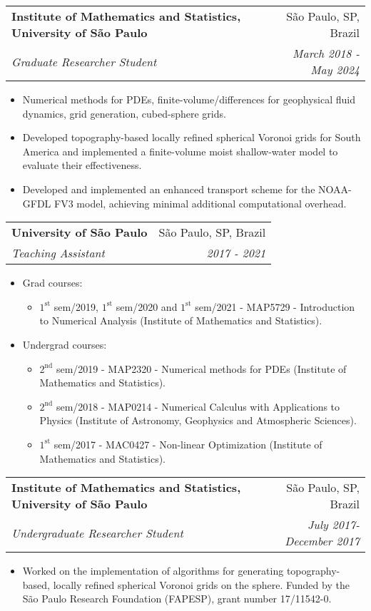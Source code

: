 \documentclass[letterpaper,11pt]{article}
\makeatletter
\newcommand{\resumeItem}[1]{
  \item\small{
    {#1 \vspace{-2pt}}
  }
}
\newcommand{\resumeSubheading}[4]{
  \vspace{-2pt}\item
    \begin{tabular*}{0.97\textwidth}[t]{l@{\extracolsep{\fill}}r}
      \textbf{#1} & #2 \\
      \textit{\small#3} & \textit{\small #4} \\
    \end{tabular*}\vspace{-7pt}
}
\newcommand{\resumeItemListStart}{\begin{itemize}}
\newcommand{\resumeItemListEnd}{\end{itemize}\vspace{-5pt}}
\makeatother
\begin{document}
\resumeSubheading
{Institute of Mathematics and Statistics, University of São Paulo}{São Paulo, SP, Brazil}{Graduate Researcher Student}
{March 2018 - May 2024}  
\resumeItemListStart
\resumeItem{Numerical methods for PDEs, finite-volume/differences for geophysical fluid dynamics, grid generation, cubed-sphere grids.}
\resumeItem{Developed topography-based locally refined spherical Voronoi grids for South America and implemented a finite-volume moist shallow-water model to evaluate their effectiveness.}
\resumeItem{Developed and implemented an enhanced transport scheme for the NOAA-GFDL FV3 model, achieving minimal additional computational overhead.}
\resumeItemListEnd



\resumeSubheading
{University of São Paulo}{São Paulo, SP, Brazil}
{Teaching Assistant}{2017 - 2021}
\resumeItemListStart
\resumeItem{Grad courses:}   
\begin{itemize}[label=\textendash]
	\item $1^{\textrm{st}}$ sem/2019, $1^{\textrm{st}}$ sem/2020 and $1^{\textrm{st}}$ sem/2021 - MAP5729 - Introduction to Numerical Analysis (Institute of Mathematics and Statistics).
\end{itemize} 
\resumeItem{Undergrad courses:}   
\begin{itemize}[label=\textendash]
	\item $2^{\textrm{nd}}$ sem/2019 - MAP2320 - Numerical methods for PDEs (Institute of Mathematics and Statistics).
	\item {$2^{\textrm{nd}}$ sem/2018 - MAP0214 - Numerical Calculus with Applications to Physics (Institute of Astronomy, Geophysics and Atmospheric Sciences).}        
	\item{$1^{\textrm{st}}$ sem/2017 - MAC0427 - Non-linear Optimization (Institute of Mathematics and Statistics).} 
\end{itemize}       
\resumeItemListEnd

\resumeSubheading
{Institute of Mathematics and Statistics, University of São Paulo }{São Paulo, SP, Brazil}{Undergraduate Researcher Student}
{July 2017- December 2017}
\resumeItemListStart
\resumeItem{Worked on the implementation of algorithms for generating topography-based, locally refined spherical Voronoi grids on the sphere. Funded by the São Paulo Research Foundation (FAPESP), grant number 17/11542-0.}
\resumeItemListEnd
\end{document}
